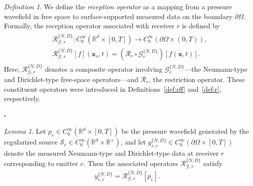 \documentclass[11pt,reqno]{amsart}
\theoremstyle{remark}
\newtheorem{definition}{Definition}
\theoremstyle{italic_lemma}
\newtheorem{lemma}{Lemma}
\newcommand{\bx}{\boldsymbol{x}}
\begin{document}
\begin{definition}  \label{def:r-nd}
We define the \emph{reception operator} as a mapping from a pressure wavefield in free space to surface-supported measured data on the boundary \( \partial \Omega \). Formally, the reception operator associated with receiver \( r \) is defined by
\begin{align} 
\begin{split}
    &\mathcal{R}_{\mathcal{G},r}^{\{N,D\}} : C_0^{\infty}\left( \mathbb{R}^d \times [0,T] \right) \rightarrow C_0^{\infty}\left( \partial \Omega \times (0,T) \right), \\
    &\mathcal{R}_{\mathcal{G},r}^{\{N,D\}} [f](\bx_s, t) = \left( \mathcal{R}_r \circ \mathcal{G}_r^{\{N,D\}} \right)\left[f(\bx, t)\right].
\end{split}
\end{align}
Here, \( \mathcal{R}_{\mathcal{G},r}^{\{N,D\}} \) denotes a composite operator involving \( \mathcal{G}_r^{\{N,D\}} \)—the Neumann-type and Dirichlet-type free-space operators—and \( \mathcal{R}_r \), the restriction operator. These constituent operators were introduced in Definitions~\ref{def:rff} and~\ref{def:r}, respectively.
\end{definition}
\hfill\(\square\)




\begin{lemma}  \label{lemma:extraction2}
Let \( p_e \in C_0^{\infty}\left( \mathbb{R}^d \times [0,T] \right) \) be the pressure wavefield generated by the regularized source \( \mathcal{S}_e \in C_0^{\infty}\left( \mathbb{R}^d \times \mathbb{R}^+ \right) \), and let \( y_{r,e}^{\{N,D\}} \in C_0^{\infty} \left( \partial \Omega \times [0, T] \right) \) denote the measured Neumann-type and Dirichlet-type data at receiver \(r\) corresponding to emitter \(e\). Then the associated operators \( \mathcal{R}_{ \mathcal{G},r}^{\{N,D\}} \) satisfy
\begin{align}
   y_{r,e}^{\{N,D\}} = \mathcal{R}_{\mathcal{G},r}^{\{N,D\}} \left[ p_e \right].
\end{align}
\end{lemma}
\end{document}
